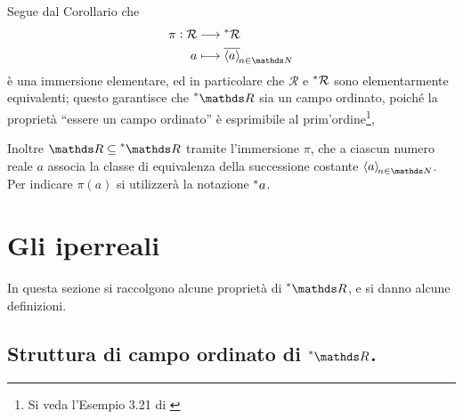     Segue dal Corollario  che \begin{align*}
    \pi: \mathcal{R} &\longrightarrow  \null^{*}\mathcal{R}\\
    a &\longmapsto \filtersequence{a}
    \end{align*}è una immersione elementare, ed in particolare che $ \mathcal{R} $ e $ \null^{*} \mathcal{R} $ sono elementarmente equivalenti; questo garantisce che $ \starR $ sia un campo ordinato, poiché la proprietà ``essere un campo ordinato'' è esprimibile al prim'ordine\footnote{Si veda l'Esempio 3.21 di \cite{andretta_elements_2022}},
    
    Inoltre $ \R \subseteq \starR $ tramite l'immersione $ \pi $, che a ciascun numero reale $ a $ associa la classe di equivalenza della successione costante $ \sequence{a} $. Per indicare $ \pi(a) $ si utilizzerà la notazione $ \prescript{*}{}{a} $.




\section{Gli iperreali}

In questa sezione si raccolgono alcune proprietà di $ \starR $, e si danno alcune definizioni.

\subsection{Struttura di campo ordinato di $ \starR $.}


